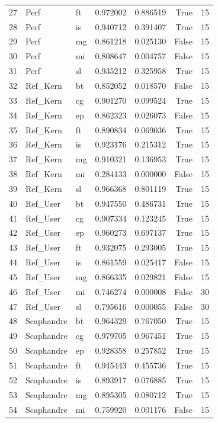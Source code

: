 \begin{tabular}{lllrrrr}
27 & Perf & ft & 0.972002 & 0.886519 & True & 15 \\
28 & Perf & is & 0.940712 & 0.391407 & True & 15 \\
29 & Perf & mg & 0.861218 & 0.025130 & False & 15 \\
30 & Perf & mi & 0.808647 & 0.004757 & False & 15 \\
31 & Perf & sl & 0.935212 & 0.325958 & True & 15 \\
32 & Ref_Kern & bt & 0.852052 & 0.018570 & False & 15 \\
33 & Ref_Kern & cg & 0.901270 & 0.099524 & True & 15 \\
34 & Ref_Kern & ep & 0.862323 & 0.026073 & False & 15 \\
35 & Ref_Kern & ft & 0.890834 & 0.069036 & True & 15 \\
36 & Ref_Kern & is & 0.923176 & 0.215312 & True & 15 \\
37 & Ref_Kern & mg & 0.910321 & 0.136953 & True & 15 \\
38 & Ref_Kern & mi & 0.284133 & 0.000000 & False & 15 \\
39 & Ref_Kern & sl & 0.966368 & 0.801119 & True & 15 \\
40 & Ref_User & bt & 0.947550 & 0.486731 & True & 15 \\
41 & Ref_User & cg & 0.907334 & 0.123245 & True & 15 \\
42 & Ref_User & ep & 0.960273 & 0.697137 & True & 15 \\
43 & Ref_User & ft & 0.932075 & 0.293005 & True & 15 \\
44 & Ref_User & is & 0.861559 & 0.025417 & False & 15 \\
45 & Ref_User & mg & 0.866335 & 0.029821 & False & 15 \\
46 & Ref_User & mi & 0.746274 & 0.000008 & False & 30 \\
47 & Ref_User & sl & 0.795616 & 0.000055 & False & 30 \\
48 & Scaphandre & bt & 0.964329 & 0.767050 & True & 15 \\
49 & Scaphandre & cg & 0.979705 & 0.967451 & True & 15 \\
50 & Scaphandre & ep & 0.928358 & 0.257852 & True & 15 \\
51 & Scaphandre & ft & 0.945443 & 0.455736 & True & 15 \\
52 & Scaphandre & is & 0.893917 & 0.076885 & True & 15 \\
53 & Scaphandre & mg & 0.895305 & 0.080712 & True & 15 \\
54 & Scaphandre & mi & 0.759920 & 0.001176 & False & 15 \\

\end{tabular}
